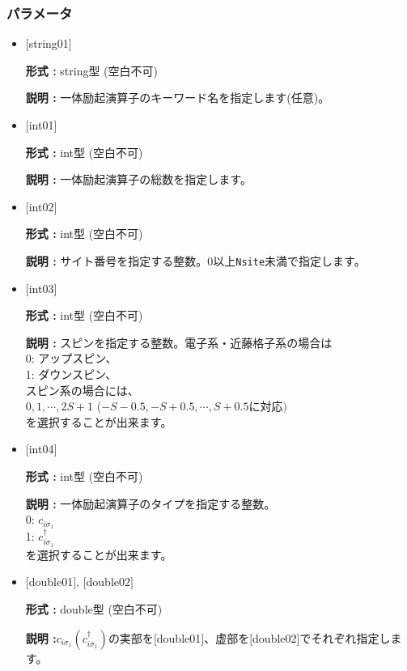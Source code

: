 \subsubsection{パラメータ}
 \begin{itemize}

   \item  $[$string01$]$
   
    {\bf 形式 :} string型 (空白不可)

   {\bf 説明 :} 一体励起演算子のキーワード名を指定します(任意)。

   \item  $[$int01$]$
   
    {\bf 形式 :} int型 (空白不可)

   {\bf 説明 :} 一体励起演算子の総数を指定します。

  \item  $[$int02$]$

 {\bf 形式 :} int型 (空白不可)

{\bf 説明 :} サイト番号を指定する整数。0以上\verb|Nsite|{未満}で指定します。
 
  \item  $[$int03$]$
  
 {\bf 形式 :} int型 (空白不可)

{\bf 説明 :} 
スピンを指定する整数。電子系・近藤格子系の場合は\\
0: アップスピン、\\
1: ダウンスピン、\\
スピン系の場合には、\\
$0, 1, \cdots, 2S+1$ ($-S-0.5, -S+0.5, \cdots, S+0.5$に対応$)$\\
を選択することが出来ます。

\item  $[$int04$]$

 {\bf 形式 :} int型 (空白不可)

{\bf 説明 :} 一体励起演算子のタイプを指定する整数。\\
0: $ c_{i\sigma_1}$\\
1: $ c_{i\sigma_1}^{\dagger}$\\
を選択することが出来ます。

\item  $[$double01$]$, $[$double02$]$

 {\bf 形式 :} double型 (空白不可)

{\bf 説明 :}$c_{i\sigma_1}(c_{i\sigma_1}^{\dag})$の実部を$[$double01$]$、虚部を$[$double02$]$でそれぞれ指定します。

\end{itemize}

